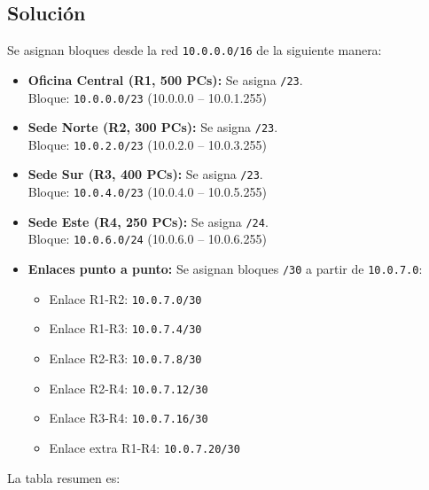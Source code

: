 \documentclass[a4paper,12pt]{article}
\begin{document}
\subsection{Solución}
Se asignan bloques desde la red \texttt{10.0.0.0/16} de la siguiente manera:
\begin{itemize}
  \item \textbf{Oficina Central (R1, 500 PCs):} Se asigna \texttt{/23}. \\
        \quad Bloque: \texttt{10.0.0.0/23} \quad (10.0.0.0 -- 10.0.1.255)
  \item \textbf{Sede Norte (R2, 300 PCs):} Se asigna \texttt{/23}. \\
        \quad Bloque: \texttt{10.0.2.0/23} \quad (10.0.2.0 -- 10.0.3.255)
  \item \textbf{Sede Sur (R3, 400 PCs):} Se asigna \texttt{/23}. \\
        \quad Bloque: \texttt{10.0.4.0/23} \quad (10.0.4.0 -- 10.0.5.255)
  \item \textbf{Sede Este (R4, 250 PCs):} Se asigna \texttt{/24}. \\
        \quad Bloque: \texttt{10.0.6.0/24} \quad (10.0.6.0 -- 10.0.6.255)
  \item \textbf{Enlaces punto a punto:} Se asignan bloques \texttt{/30} a partir de \texttt{10.0.7.0}:
    \begin{itemize}
      \item Enlace R1-R2: \texttt{10.0.7.0/30}
      \item Enlace R1-R3: \texttt{10.0.7.4/30}
      \item Enlace R2-R3: \texttt{10.0.7.8/30}
      \item Enlace R2-R4: \texttt{10.0.7.12/30}
      \item Enlace R3-R4: \texttt{10.0.7.16/30}
      \item Enlace extra R1-R4: \texttt{10.0.7.20/30}
    \end{itemize}
\end{itemize}

La tabla resumen es:
\end{document}
